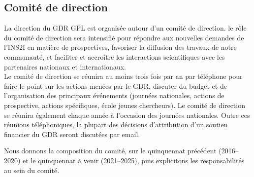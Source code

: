 \documentclass[11pt]{article}
\newcommand{\mynote}[3][black]{\textcolor{#1}{\fbox{\bfseries\sffamily\scriptsize{#2}}
{\small$\blacktriangleright$\textsf{\emph{#3}}$\blacktriangleleft$}}}
\newcommand{\TODO}[1]{\mynote[red]{TODO}{#1}}
\begin{document}


\subsection{Comité de direction}

La direction du GDR GPL est organisée autour d'un comité de direction. le rôle du comité de direction sera intensifié pour répondre aux nouvelles demandes de l'INS2I en matière de prospectives, favoriser la diffusion des travaux de notre communauté, et faciliter et accroître les interactions scientifiques avec les partenaires nationaux et internationaux. \\
Le comité de direction se réunira au moins trois fois par an par téléphone pour faire le point sur les actions menées par le GDR, discuter du budget et de l'organisation des
principaux événements (journées nationales, actions de prospective, actions
spécifiques, école jeunes chercheurs). Le comité de direction se réunira
également chaque année à l'occasion des journées nationales. Outre ces réunions téléphoniques, la plupart des décisions d'attribution d'un
soutien financier du GDR seront discutées par email.

Nous donnons la
composition du comité, sur le quinquennat précédent (2016--2020) et le quinquennat à venir
(2021--2025), puis explicitons les responsabilités au sein du comité.
\end{document}
